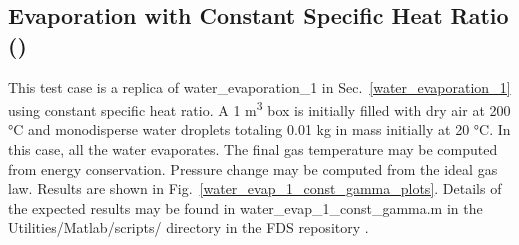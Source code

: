 \documentclass[11pt]{book}
\begin{document}
\subsection{Evaporation with Constant Specific Heat Ratio (\texorpdfstring{}{water\_evap\_1\_const\_gamma})}
\label{water_evap_1_const_gamma}

This test case is a replica of {\ct water\_evaporation\_1} in Sec.~\ref{water_evaporation_1} using constant specific heat ratio.  A 1 \si{m^3} box is initially filled with dry air at 200 \si{\degreeCelsius} and monodisperse water droplets totaling 0.01 kg in mass initially at 20 \si{\degreeCelsius}.  In this case, all the water evaporates.  The final gas temperature may be computed from energy conservation.  Pressure change may be computed from the ideal gas law.  Results are shown in Fig.~\ref{water_evap_1_const_gamma_plots}.  Details of the expected results may be found in {\ct water\_evap\_1\_const\_gamma.m} in the {\ct Utilities/Matlab/scripts/} directory in the FDS repository \cite{FDS-SMV_repository}.
\end{document}

